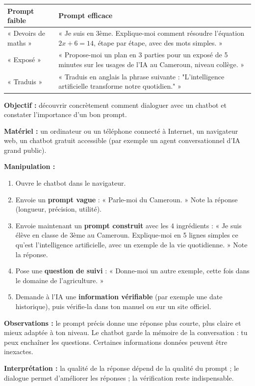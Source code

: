 \documentclass[11pt]{article}
\begin{document}
\begin{exemplebox}
\begin{center}
\begin{tabularx}{\linewidth}{|X|X|}
\hline
\rowcolor{popblueL} \textbf{Prompt faible} & \textbf{Prompt efficace} \\
\hline
« Devoirs de maths » & « Je suis en 3ème. Explique-moi comment résoudre l'équation $2x + 6 = 14$, étape par étape, avec des mots simples. » \\
\hline
« Exposé » & « Propose-moi un plan en 3 parties pour un exposé de 5 minutes sur les usages de l'IA au Cameroun, niveau collège. » \\
\hline
« Traduis » & « Traduis en anglais la phrase suivante : "L'intelligence artificielle transforme notre quotidien." » \\
\hline
\end{tabularx}
\end{center}
\end{exemplebox}

\begin{experience}
\textbf{Objectif :} découvrir concrètement comment dialoguer avec un chatbot et constater l'importance d'un bon prompt.

\textbf{Matériel :} un ordinateur ou un téléphone connecté à Internet, un navigateur web, un chatbot gratuit accessible (par exemple un agent conversationnel d'IA grand public).

\textbf{Manipulation :}
\begin{enumerate}
\item Ouvre le chatbot dans le navigateur.
\item Envoie un \textbf{prompt vague} : « Parle-moi du Cameroun. » Note la réponse (longueur, précision, utilité).
\item Envoie maintenant un \textbf{prompt construit} avec les 4 ingrédients : « Je suis élève en classe de 3ème au Cameroun. Explique-moi en 5 lignes simples ce qu'est l'intelligence artificielle, avec un exemple de la vie quotidienne. » Note la réponse.
\item Pose une \textbf{question de suivi} : « Donne-moi un autre exemple, cette fois dans le domaine de l'agriculture. »
\item Demande à l'IA une \textbf{information vérifiable} (par exemple une date historique), puis vérifie-la dans ton manuel ou sur un site officiel.
\end{enumerate}

\textbf{Observations :} le prompt précis donne une réponse plus courte, plus claire et mieux adaptée à ton niveau. Le chatbot garde la mémoire de la conversation : tu peux enchaîner les questions. Certaines informations données peuvent être inexactes.

\textbf{Interprétation :} la qualité de la réponse dépend de la qualité du prompt ; le dialogue permet d'améliorer les réponses ; la vérification reste indispensable.
\end{experience}
\end{document}
